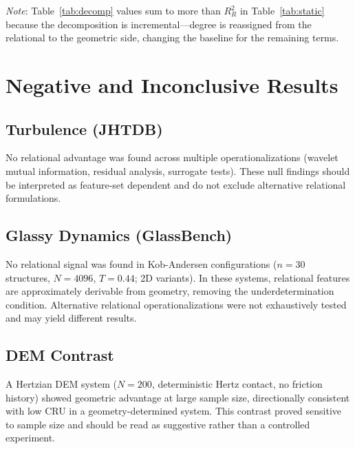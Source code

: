 \documentclass[11pt,a4paper]{article}
\begin{document}
\textit{Note}: Table~\ref{tab:decomp} values sum to more than $R^2_R$ in Table~\ref{tab:static} because the decomposition is incremental---degree is reassigned from the relational to the geometric side, changing the baseline for the remaining terms.

\section{Negative and Inconclusive Results}

\subsection{Turbulence (JHTDB)}
No relational advantage was found across multiple operationalizations (wavelet mutual information, residual analysis, surrogate tests).
These null findings should be interpreted as feature-set dependent and do not exclude alternative relational formulations.

\subsection{Glassy Dynamics (GlassBench)}
No relational signal was found in Kob-Andersen configurations ($n=30$ structures, $N=4096$, $T=0.44$; 2D variants).
In these systems, relational features are approximately derivable from geometry, removing the underdetermination condition.
Alternative relational operationalizations were not exhaustively tested and may yield different results.

\subsection{DEM Contrast}
A Hertzian DEM system ($N=200$, deterministic Hertz contact, no friction history) showed geometric advantage at large sample size, directionally consistent with low CRU in a geometry-determined system.
This contrast proved sensitive to sample size and should be read as suggestive rather than a controlled experiment.
\end{document}
